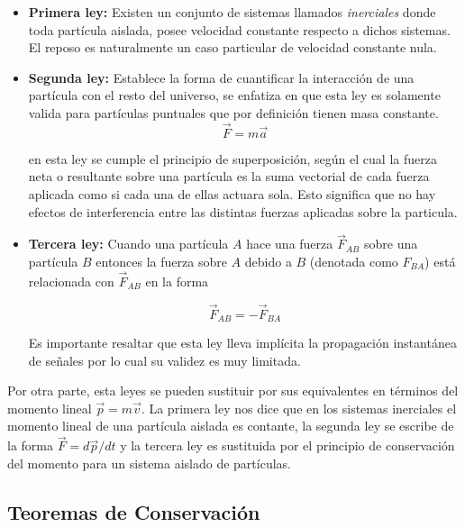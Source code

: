 \documentclass[12pt]{report}
\begin{document}
\begin{itemize}

\item{\textbf{Primera ley:}} Existen un conjunto de sistemas  llamados \textit{inerciales} donde toda partícula aislada, posee velocidad constante respecto a dichos sistemas. El reposo es naturalmente un caso particular de velocidad constante nula.

\item{\textbf{Segunda ley:}} Establece la forma de cuantificar la interacción de una partícula con el resto del universo, se enfatiza en que esta ley es solamente valida para partículas puntuales que por definición tienen masa constante.\\

\begin{equation}\label{1.1}
\vec{F}=m\vec{a} 
\end{equation}

en esta ley se cumple el principio de superposición, según el cual la fuerza neta o resultante sobre una partícula es la suma vectorial de cada fuerza aplicada como si cada una de ellas actuara sola. Esto significa que no hay efectos de interferencia entre las distintas fuerzas aplicadas sobre la particula.

\item{\textbf{Tercera ley:}} Cuando una partícula $A$ hace una fuerza $\vec{F}_{AB}$ sobre una partícula $B$ entonces la fuerza sobre $A$ debido a $B$ (denotada como $F_{BA}$) está relacionada con $\vec{F}_{AB}$ en la forma

\begin{equation}\label{1.2}
\vec{F}_{AB} = -\vec{F}_{BA}
\end{equation}

Es importante resaltar que esta ley lleva implícita la propagación instantánea de señales por lo cual su validez es muy limitada.

\end{itemize}

Por otra parte, esta leyes se pueden sustituir por sus equivalentes en términos del momento lineal 
$\vec{p}=m\vec{v}$. La primera ley nos dice que en los sistemas inerciales el momento lineal de una partícula aislada es contante, la segunda ley se escribe de la forma $\displaystyle\vec{F}=d\vec{p}/dt$ y la tercera ley es sustituida por el principio de conservación del momento para un sistema aislado de partículas.




\subsection{Teoremas de Conservación}
\end{document}
